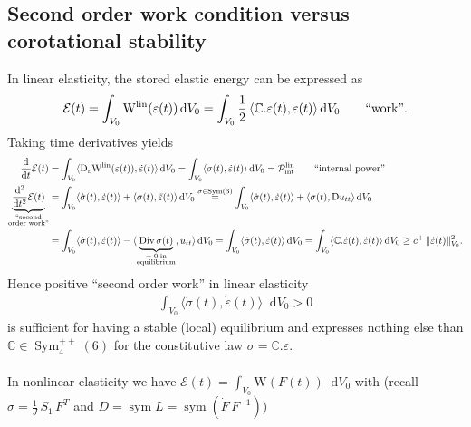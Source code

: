 \documentclass[10pt]{article}
\numberwithin{theoremCounter}{section}
\theoremstyle{plain}
\theoremstyle{definition}
\newcommand{\norm}[1]{\lVert #1 \rVert}
\newcommand{\DD}{\mathrm{D}}
\newcommand{\WW}{\mathrm{W}}
\newcommand*\dif{\mathop{}\!\mathrm{d}}
\DeclareMathOperator{\lin}{lin}
\DeclareMathOperator{\Sym}{Sym}
\DeclareMathOperator{\sym}{sym}
\def\C{\mathbb{C}}
\numberwithin{equation}{section}
\begin{document}
\begin{appendix}
\subsection{Second order work condition versus corotational stability} \label{appsecondorderwork}
%
In linear elasticity, the stored elastic energy can be expressed as
	\begin{align}
	\mathcal{E}(t) = \int_{V_0} \WW^{\lin}(\varepsilon(t)) \dif V_0 = \int_{V_0} \frac12 \, \langle \C . \varepsilon(t), \varepsilon(t) \rangle \dif V_0 \qquad \textnormal{``work''}.
	\end{align}
Taking time derivatives yields
	\begin{align}
	\frac{\dif}{\dif t} \mathcal{E}(t) &= \int_{V_0} \langle \DD_{\varepsilon} \WW^{\lin}(\varepsilon(t)), \dot{\varepsilon}(t) \rangle \dif V_0 = \int_{V_0} \langle \sigma(t) , \dot{\varepsilon}(t) \rangle \dif V_0 = \mathcal{P}_{\textnormal{int}}^{\lin} \qquad \textnormal{``internal power''} \notag \\
	\underbrace{\frac{\dif^2}{\dif t^2} \mathcal{E}(t)}_{\substack{\textnormal{``second} \\ \textnormal{order work''}}} &= \int_{V_0} \langle \dot{\sigma}(t), \dot{\varepsilon}(t) \rangle + \langle \sigma(t), \ddot{\varepsilon}(t) \rangle \dif V_0 \overset{\sigma \in \Sym(3)}{=} \int_{V_0} \langle \dot{\sigma}(t) , \dot{\varepsilon}(t) \rangle + \langle \sigma(t) , \DD u_{tt} \rangle \dif V_0 \\
	&= \int_{V_0} \langle \dot{\sigma}(t), \dot{\varepsilon}(t) \rangle - \langle \underbrace{\textnormal{Div} \, \sigma(t)}_{\substack{= \; 0 \; \textnormal{in} \\ \textnormal{equilibrium}}} , u_{tt} \rangle \dif V_0 = \int_{V_0} \langle \dot{\sigma}(t) , \dot{\varepsilon}(t) \rangle \dif V_0 = \int_{V_0} \langle \C . \dot{\varepsilon}(t), \dot{\varepsilon}(t) \rangle \dif V_0 \ge c^{+} \, \norm{\dot{\varepsilon}(t)}^2_{V_0}. \notag
	\end{align}
Hence positive ``second order work'' in linear elasticity
	\begin{align}
	\int_{V_0} \langle \dot{\sigma}(t), \dot{\varepsilon}(t) \rangle \dif V_0 > 0
	\end{align}
is sufficient for having a stable (local) equilibrium and expresses nothing else than $\C \in \Sym^{++}_4(6)$ for the constitutive law $\sigma = \C . \varepsilon$. \\
\\
In nonlinear elasticity we have $\mathcal{E}(t) = \int_{V_0} \WW(F(t)) \dif V_0$ with (recall $\sigma = \frac{1}{J} \, S_1 \, F^T$ and $D = \sym L = \sym (\dot F \, F^{-1})$)

\end{appendix}
\end{document}

